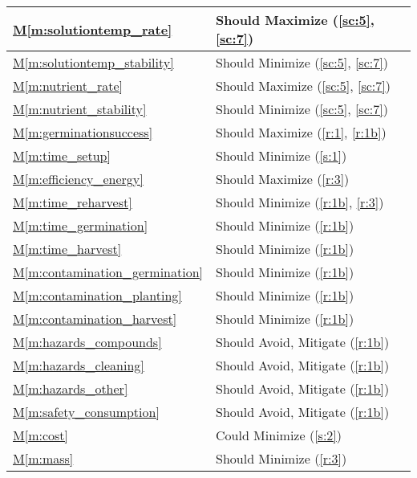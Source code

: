 \documentclass{report}
\newcommand{\mref}[1]{\hyperref[#1]{M\ref{#1}}}
\begin{document}
\begin{tabular}{|l|p{14.35cm}|}
    \hline
    \mref{m:solutiontemp_rate} & Should Maximize \hfill (\ref{sc:5}, \ref{sc:7}) \\
    \hline
    \mref{m:solutiontemp_stability} & Should Minimize \hfill (\ref{sc:5}, \ref{sc:7}) \\
    \hline
    \mref{m:nutrient_rate} & Should Maximize \hfill (\ref{sc:5}, \ref{sc:7}) \\
    \hline
    \mref{m:nutrient_stability} & Should Minimize \hfill (\ref{sc:5}, \ref{sc:7}) \\
    \hline
    \mref{m:germinationsuccess} & Should Maximize \hfill (\ref{r:1}, \ref{r:1b}) \\
    \hline
    \mref{m:time_setup} & Should Minimize \hfill (\ref{s:1}) \\
    \hline
    \mref{m:efficiency_energy} & Should Maximize \hfill (\ref{r:3}) \\
    \hline
    \mref{m:time_reharvest} & Should Minimize \hfill (\ref{r:1b}, \ref{r:3}) \\
    \hline
    \mref{m:time_germination} & Should Minimize \hfill (\ref{r:1b}) \\
    \hline
    \mref{m:time_harvest} & Should Minimize \hfill (\ref{r:1b}) \\
    \hline
    \mref{m:contamination_germination} & Should Minimize \hfill (\ref{r:1b}) \\
    \hline
    \mref{m:contamination_planting} & Should Minimize \hfill (\ref{r:1b}) \\
    \hline
    \mref{m:contamination_harvest} & Should Minimize \hfill (\ref{r:1b}) \\
    \hline
    \mref{m:hazards_compounds} & Should Avoid, Mitigate \hfill (\ref{r:1b}) \\
    \hline
    \mref{m:hazards_cleaning} & Should Avoid, Mitigate \hfill (\ref{r:1b}) \\
    \hline
    \mref{m:hazards_other} & Should Avoid, Mitigate \hfill (\ref{r:1b}) \\
    \hline
    \mref{m:safety_consumption} & Should Avoid, Mitigate \hfill (\ref{r:1b}) \\
    \hline
    \mref{m:cost} & Could Minimize \hfill (\ref{s:2}) \\
    \hline
    \mref{m:mass} & Should Minimize \hfill (\ref{r:3}) \\
    \hline
\end{tabular}

\end{document}

